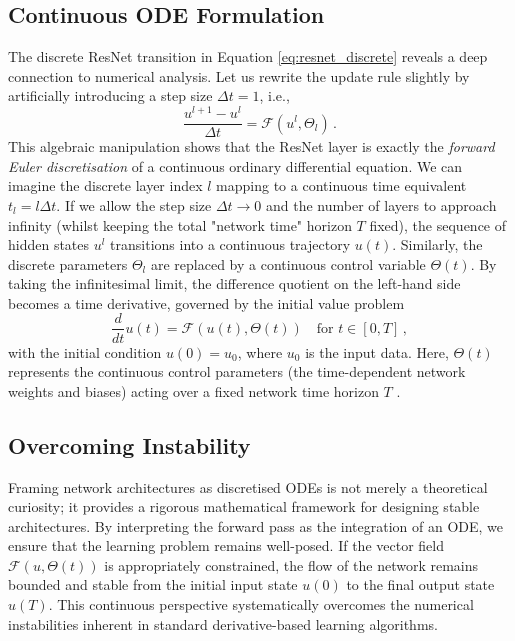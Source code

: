 \subsection{Continuous ODE Formulation}

The discrete ResNet transition in Equation \eqref{eq:resnet_discrete} reveals a deep connection to numerical analysis. Let us rewrite the update rule slightly by artificially introducing a step size $\Delta t = 1$, i.e.,
\begin{equation*}
    \frac{u^{l+1} - u^l}{\Delta t} = \mathcal{F}(u^l, \Theta_l) \, .
\end{equation*}
This algebraic manipulation shows that the ResNet layer is exactly the \emph{forward Euler discretisation} of a continuous ordinary differential equation. We can imagine the discrete layer index $l$ mapping to a continuous time equivalent $t_l = l \Delta t$. If we allow the step size $\Delta t \to 0$ and the number of layers to approach infinity (whilst keeping the total "network time" horizon $T$ fixed), the sequence of hidden states $u^l$ transitions into a continuous trajectory $u(t)$. Similarly, the discrete parameters $\Theta_l$ are replaced by a continuous control variable $\Theta(t)$. By taking the infinitesimal limit, the difference quotient on the left-hand side becomes a time derivative, governed by the initial value problem
\begin{equation*}
    \frac{d}{dt}u(t) = \mathcal{F}\left(u(t), \Theta(t)\right) \quad \text{for } t \in [0, T] \, ,
\end{equation*}
with the initial condition $u(0) = u_0$, where $u_0$ is the input data. Here, $\Theta(t)$ represents the continuous control parameters (the time-dependent network weights and biases) acting over a fixed network time horizon $T$ \cite{e2017proposal, haber2017stable, benning2019deep}.

\subsection{Overcoming Instability}

Framing network architectures as discretised ODEs is not merely a theoretical curiosity; it provides a rigorous mathematical framework for designing stable architectures. By interpreting the forward pass as the integration of an ODE, we ensure that the learning problem remains well-posed. If the vector field $\mathcal{F}(u, \Theta(t))$ is appropriately constrained, the flow of the network remains bounded and stable from the initial input state $u(0)$ to the final output state $u(T)$. This continuous perspective systematically overcomes the numerical instabilities inherent in standard derivative-based learning algorithms.

